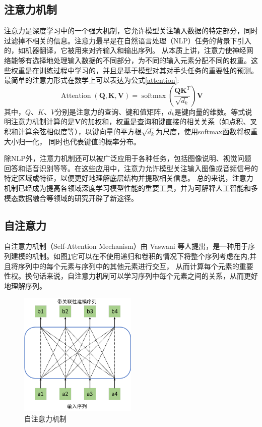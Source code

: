\subsection{注意力机制}
注意力是深度学习中的一个强大机制，它允许模型关注输入数据的特定部分，同时过滤掉不相关的信息。注意力最早是在自然语言处理（NLP）任务的背景下引入的，如机器翻译，它被用来对齐输入和输出序列。
从本质上讲，注意力使神经网络能够有选择地处理输入数据的不同部分，为不同的输入元素分配不同的权重。这些权重是在训练过程中学习的，并且是基于模型对其对手头任务的重要性的预测。
最简单的注意力形式在数学上可以表达为公式\eqref{attention}:
\begin{equation}
	\label{attention}
	\operatorname{Attention}(\mathbf{Q}, \mathbf{K}, \mathbf{V})=\operatorname{softmax}\left(\frac{\mathbf{Q K}^T}{\sqrt{d_k}}\right) \mathbf{V}
\end{equation}
其中，$Q$、$K$、$V$分别是注意力的查询、键和值矩阵，$d_k$是键向量的维数。等式说明注意力机制计算的是$\mathbf{V}$的加权和，权重是查询和键直接的相关关系（如点积、叉积和计算余弦相似度等），以键向量的平方根$\sqrt{d_k}$为尺度，使用softmax函数将权重大小归一化，
同时也代表键值的概率分布。

除NLP外，注意力机制还可以被广泛应用于各种任务，包括图像说明、视觉问题回答和语音识别等等。在这些应用中，注意力允许模型关注输入图像或音频信号的特定区域或特征，以便更好地理解底层结构并提取相关信息。
总的来说，注意力机制已经成为提高各领域深度学习模型性能的重要工具，并为可解释人工智能和多模态数据融合等领域的研究开辟了新途径。

\subsection{自注意力}
自注意力机制（Self-Attention Mechanism）由 Vaswani 等人\cite{vaswani2017attention}提出，是一种用于序列建模的机制。如图\ref{selfatt}它可以在不使用递归和卷积的情况下将整个序列考虑在内,并且将序列中的每个元素与序列中的其他元素进行交互，
从而计算每个元素的重要性权。换句话来说，自注意力机制可以学习序列中每个元素之间的关系，从而更好地理解序列。
\begin{figure}[htbp]
	\centering	
	\includegraphics[width=0.5\textwidth]{Fig/myfig/chapter2/selfatt.png}  %
	\caption{\label{selfatt}自注意力机制} 
\end{figure}

